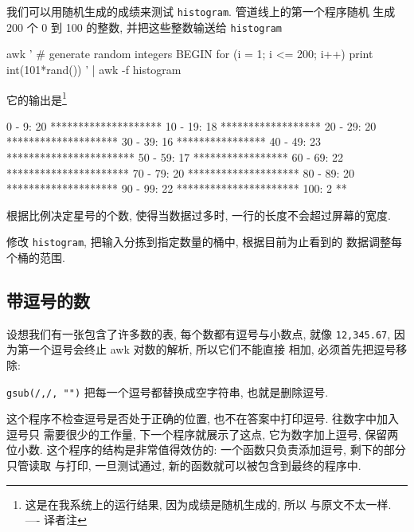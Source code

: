 我们可以用随机生成的成绩来测试 \verb'histogram'. 管道线上的第一个程序随机
生成 200 个 0 到 100 的整数, 并把这些整数输送给 \verb'histogram'
\begin{awkcode}
    awk '
    # generate random integers
    BEGIN { for (i = 1; i <= 200; i++)
                print int(101*rand())
          }
    ' |
    awk -f histogram
\end{awkcode}
它的输出是\footnote{这是在我系统上的运行结果, 因为成绩是随机生成的, 所以 
与原文不太一样. ---- 译者注}
\begin{shell}
      0 -  9:  20 ********************
     10 - 19:  18 ******************
     20 - 29:  20 ********************
     30 - 39:  16 ****************
     40 - 49:  23 ***********************
     50 - 59:  17 *****************
     60 - 69:  22 **********************
     70 - 79:  20 ********************
     80 - 89:  20 ********************
     90 - 99:  22 **********************
    100:        2 **
\end{shell}

\begin{exercise}
    根据比例决定星号的个数, 使得当数据过多时, 一行的长度不会超过屏幕的宽度.
\end{exercise}

\begin{exercise}
    修改 \verb'histogram', 把输入分拣到指定数量的桶中, 根据目前为止看到的
    数据调整每个桶的范围.
\end{exercise}

\subsection{带逗号的数}
\label{subsec:numbers_with_commas}

设想我们有一张包含了许多数的表, 每个数都有逗号与小数点, 就像
\verb'12,345.67', 因为第一个逗号会终止 awk 对数的解析, 所以它们不能直接
相加, 必须首先把逗号移除:
\verb'gsub(/,/, "")' 把每一个逗号都替换成空字符串, 也就是删除逗号.

这个程序不检查逗号是否处于正确的位置,
也不在答案中打印逗号. 往数字中加入逗号只
需要很少的工作量, 下一个程序就展示了这点, 它为数字加上逗号, 保留两位小数.
这个程序的结构是非常值得效仿的: 一个函数只负责添加逗号, 剩下的部分只管读取
与打印, 一旦测试通过, 新的函数就可以被包含到最终的程序中.

